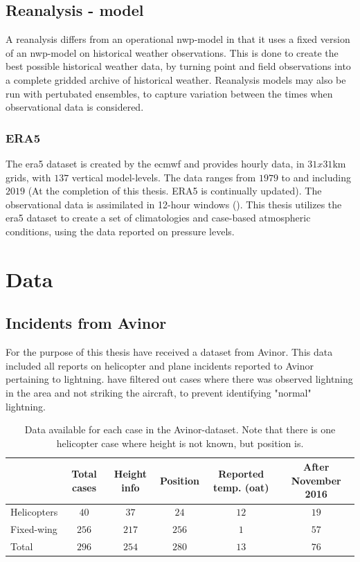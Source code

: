\subsection{Reanalysis - model}\label{sec:ra}

A reanalysis differs from an operational \acrshort{nwp}-model in that it uses a fixed version of an \acrshort{nwp}-model on historical weather observations. This is done to create the best possible historical weather data, by turning point and field observations into a complete gridded archive of historical weather. Reanalysis models may also be run with pertubated ensembles, to capture variation between the times when observational data is considered.

\subsubsection{ERA5}\label{sec:era5}
The \acrfull{era5} dataset is created by the \acrfull{ecmwf} and provides hourly data, in $31x31$km grids, with $137$ vertical model-levels. The data ranges from $1979$ to and including $2019$ (At the completion of this thesis. ERA5 is continually updated). The observational data is assimilated in 12-hour windows (\cite{hersbach2018}).
This thesis utilizes the \acrshort{era5} dataset to create a set of climatologies and case-based atmospheric conditions, using the data reported on pressure levels.

\section{Data}\label{sec:data}

\subsection{Incidents from Avinor}\label{sec:avinordata}
For the purpose of this thesis have received a dataset from Avinor. This data included all reports on helicopter and plane incidents reported to Avinor pertaining to lightning. have filtered out cases where there was observed lightning in the area and not striking the aircraft, to prevent identifying "normal" lightning.
\begin{table}
    \begin{tabular}{ l|c|c|c|c|c} 
    		&Total cases & Height info & Position & Reported temp. (\acrshort{oat}) & After November 2016\\
     		\hline
     		Helicopters &$40$ & $37$ & $24$ & $12$&$19$\\
     		Fixed-wing &$256$ & $217$ & $256$ & $1$&$57$\\ 
     		\hline
     		Total &$296$ &$254$ & $280$ & $13$&$76$\\ 
     		\hline
    \end{tabular}
    \caption{Data available for each case in the Avinor-dataset. Note that there is one helicopter case where height is not known, but position is. }
    \label{tab:avinor}
\end{table}

